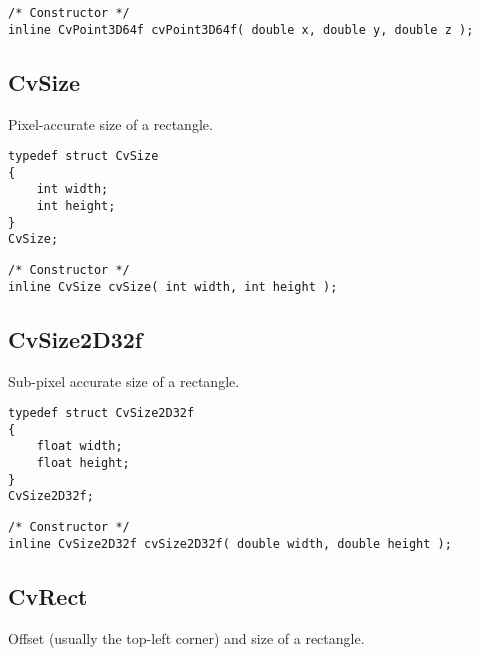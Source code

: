 \begin{description}
\end{description}

\begin{lstlisting}
/* Constructor */
inline CvPoint3D64f cvPoint3D64f( double x, double y, double z );
\end{lstlisting}

\subsection{CvSize}\label{CvSize}
Pixel-accurate size of a rectangle.

\begin{lstlisting}
typedef struct CvSize
{
    int width; 
    int height; 
}
CvSize;
\end{lstlisting}

\begin{description}
\end{description}

\begin{lstlisting}
/* Constructor */
inline CvSize cvSize( int width, int height );
\end{lstlisting}

\subsection{CvSize2D32f}\label{CvSize2D32f}
Sub-pixel accurate size of a rectangle.

\begin{lstlisting}
typedef struct CvSize2D32f
{
    float width; 
    float height; 
}
CvSize2D32f;
\end{lstlisting}

\begin{description}
\end{description}

\begin{lstlisting}
/* Constructor */
inline CvSize2D32f cvSize2D32f( double width, double height );
\end{lstlisting}

\subsection{CvRect}\label{CvRect}
Offset (usually the top-left corner) and size of a rectangle.


